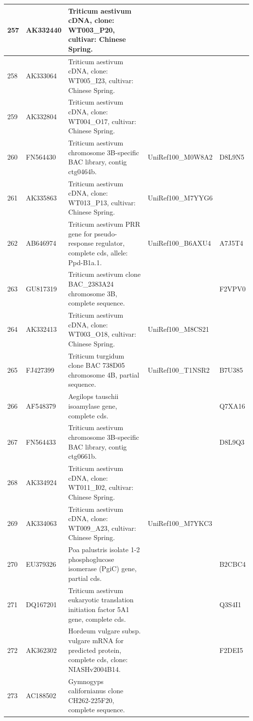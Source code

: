 \documentclass[10.9pt]{article} %
\begin{document}
{\begin{longtable}{|p{1.3cm}|p{1.8cm}|p{6.2cm}|p{3.8cm}|p{2cm}|}
\hline
257 & AK332440 & Triticum aestivum cDNA, clone: WT003\_P20, cultivar: Chinese Spring. &  & \\
\hline
258 & AK333064 & Triticum aestivum cDNA, clone: WT005\_I23, cultivar: Chinese Spring. &  & \\
\hline
259 & AK332804 & Triticum aestivum cDNA, clone: WT004\_O17, cultivar: Chinese Spring. &  & \\
\hline
260 & FN564430 & Triticum aestivum chromosome 3B-specific BAC library, contig ctg0464b. & UniRef100\_M0W8A2 & D8L9N5\\
\hline
261 & AK335863 & Triticum aestivum cDNA, clone: WT013\_P13, cultivar: Chinese Spring. & UniRef100\_M7YYG6 & \\
\hline
262 & AB646974 & Triticum aestivum PRR gene for pseudo-response regulator, complete cds, allele: Ppd-B1a.1. & UniRef100\_B6AXU4 & A7J5T4\\
\hline
263 & GU817319 & Triticum aestivum clone BAC\_2383A24 chromosome 3B, complete sequence. &  & F2VPV0\\
\hline
264 & AK332413 & Triticum aestivum cDNA, clone: WT003\_O18, cultivar: Chinese Spring. & UniRef100\_M8CS21 & \\
\hline
265 & FJ427399 & Triticum turgidum clone BAC 738D05 chromosome 4B, partial sequence. & UniRef100\_T1NSR2 & B7U385\\
\hline
266 & AF548379 & Aegilops tauschii isoamylase gene, complete cds. &  & Q7XA16\\
\hline
267 & FN564433 & Triticum aestivum chromosome 3B-specific BAC library, contig ctg0661b. &  & D8L9Q3\\
\hline
268 & AK334924 & Triticum aestivum cDNA, clone: WT011\_I02, cultivar: Chinese Spring. &  & \\
\hline
269 & AK334063 & Triticum aestivum cDNA, clone: WT009\_A23, cultivar: Chinese Spring. & UniRef100\_M7YKC3 & \\
\hline
270 & EU379326 & Poa palustris isolate 1-2 phosphoglucose isomerase (PgiC) gene, partial cds. &  & B2CBC4\\
\hline
271 & DQ167201 & Triticum aestivum eukaryotic translation initiation factor 5A1 gene, complete cds. &  & Q3S4I1\\
\hline
272 & AK362302 & Hordeum vulgare subsp. vulgare mRNA for predicted protein, complete cds, clone: NIASHv2004B14. &  & F2DEI5\\
\hline
273 & AC188502 & Gymnogyps californianus clone CH262-225F20, complete sequence. &  & \\

\end{longtable}}
\end{document}
